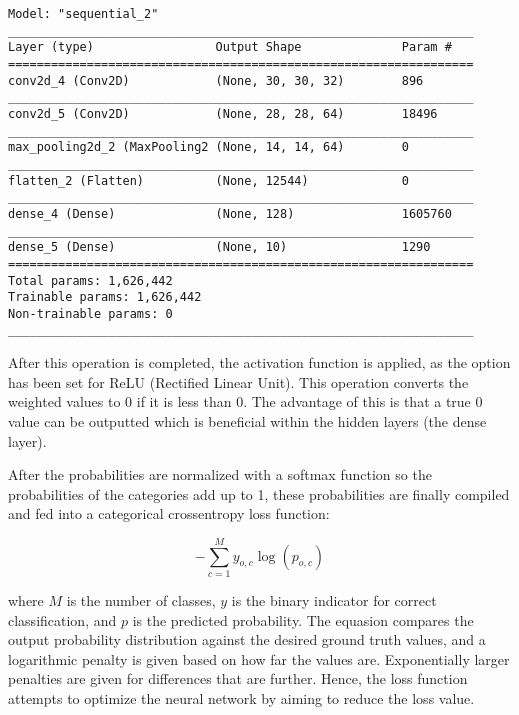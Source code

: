 \documentclass{article}
\begin{document}
\begin{lstlisting}[label={lst:sequential_2}]
Model: "sequential_2"
_________________________________________________________________
Layer (type)                 Output Shape              Param #   
=================================================================
conv2d_4 (Conv2D)            (None, 30, 30, 32)        896       
_________________________________________________________________
conv2d_5 (Conv2D)            (None, 28, 28, 64)        18496     
_________________________________________________________________
max_pooling2d_2 (MaxPooling2 (None, 14, 14, 64)        0         
_________________________________________________________________
flatten_2 (Flatten)          (None, 12544)             0         
_________________________________________________________________
dense_4 (Dense)              (None, 128)               1605760   
_________________________________________________________________
dense_5 (Dense)              (None, 10)                1290      
=================================================================
Total params: 1,626,442
Trainable params: 1,626,442
Non-trainable params: 0
_________________________________________________________________
\end{lstlisting}

After this operation is completed, the activation function is applied, as the option has been set for ReLU (Rectified Linear Unit). This operation converts the weighted values to 0 if it is less than 0. The advantage of this is that a true 0 value can be outputted which is beneficial within the hidden layers (the dense layer). \autocite[507]{deep16}

After the probabilities are normalized with a softmax function so the probabilities of the categories add up to 1, these probabilities are finally compiled and fed into a categorical crossentropy loss function:

\begin{center}
    \[ -\sum_{c=1}^{M} y_{o, c} \log \left(p_{o, c}\right) \]
\end{center}


where \(M\) is the number of classes, \(y\) is the binary indicator for correct classification, and \(p\) is the predicted probability. The equasion compares the output probability distribution against the desired ground truth values, and a logarithmic penalty is given based on how far the values are. Exponentially larger penalties are given for differences that are further. Hence, the loss function attempts to optimize the neural network by aiming to reduce the loss value.\autocite[82]{deep16}\autocite[179]{deep16}
\end{document}
